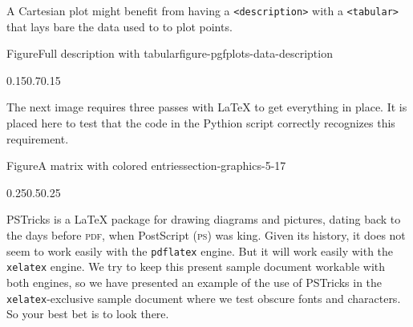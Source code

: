 \documentclass{amsart}
\theoremstyle{plain}%
\theoremstyle{definition}%
\theoremstyle{remark}%
\newcommand{\mono}[1]{\texttt{#1}}
\newcommand{\initialism}[1]{\textsc{\MakeLowercase{#1}}}
\numberwithin{equation}{section}
\newcommand{\amp}{&}
\begin{document}
A Cartesian plot might benefit from having a \mono{<description>} with a \mono{<tabular>} that lays bare the data used to to plot points.%
\begin{figureptx}{Figure}{Full description with tabular}{figure-pgfplots-data-description}{}%
\begin{image}{0.15}{0.7}{0.15}{}%
%
\end{image}%
\tcblower
\end{figureptx}%
The next image requires three passes with \LaTeX{} to get everything in place.  It is placed here to test that the code in the Pythion script correctly recognizes this requirement.%
\begin{figureptx}{Figure}{A matrix with colored entries}{section-graphics-5-17}{}%
\begin{image}{0.25}{0.5}{0.25}{}%
\resizebox{\linewidth}{!}{%
    \begin{tikzpicture}
    \node{
        $\begin{bNiceArray}{ccc|cc}[
        code-before={\cellcolor{green!72}{1-1,2-2,3-3}\cellcolor{teal!72}{1-2,2-3,3-4}\cellcolor{yellow!72}{1-3,2-4,3-5}}
        ]
        3 \amp 4 \amp 0 \amp 1 \amp 4 \\
        -2 \amp 3 \amp 1 \amp -2 \amp 3 \\
        0 \amp 2 \amp 1 \amp 0 \amp 2
        \end{bNiceArray}$
    };
\end{tikzpicture}%
}%
\end{image}%
\tcblower
\end{figureptx}%
PSTricks is a \LaTeX{} package for drawing diagrams and pictures, dating back to the days before \initialism{PDF}, when PostScript (\initialism{PS}) was king.  Given its history, it does not seem to work easily with the \mono{pdflatex} engine.  But it will work easily with the \mono{xelatex} engine.  We try to keep this present sample document workable with both engines, so we have presented an example of the use of PSTricks in the \mono{xelatex}-exclusive sample document where we test obscure fonts and characters.  So your best bet is to look there.%
\end{document}
